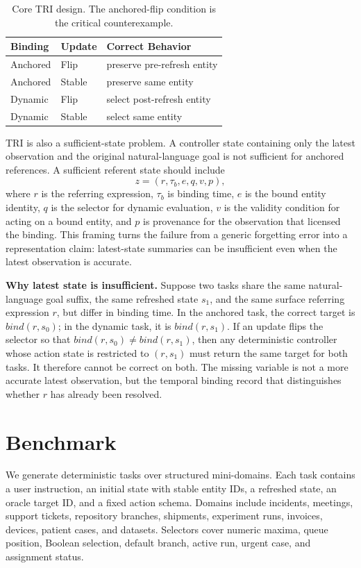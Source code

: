 \documentclass[letterpaper]{article}
\begin{document}
\begin{table}[t]
\centering
\small
\begin{tabular}{lll}
\toprule
Binding & Update & Correct Behavior \\
\midrule
Anchored & Flip & preserve pre-refresh entity \\
Anchored & Stable & preserve same entity \\
Dynamic & Flip & select post-refresh entity \\
Dynamic & Stable & select same entity \\
\bottomrule
\end{tabular}
\caption{Core TRI design. The anchored-flip condition is the critical counterexample.}
\label{tab:design}
\end{table}

TRI is also a sufficient-state problem. A controller state containing only the latest observation and the original natural-language goal is not sufficient for anchored references. A sufficient referent state should include
\[
z = (r, \tau_b, e, q, v, p),
\]
where $r$ is the referring expression, $\tau_b$ is binding time, $e$ is the bound entity identity, $q$ is the selector for dynamic evaluation, $v$ is the validity condition for acting on a bound entity, and $p$ is provenance for the observation that licensed the binding. This framing turns the failure from a generic forgetting error into a representation claim: latest-state summaries can be insufficient even when the latest observation is accurate.

\textbf{Why latest state is insufficient.} Suppose two tasks share the same natural-language goal suffix, the same refreshed state $s_1$, and the same surface referring expression $r$, but differ in binding time. In the anchored task, the correct target is $bind(r,s_0)$; in the dynamic task, it is $bind(r,s_1)$. If an update flips the selector so that $bind(r,s_0)\ne bind(r,s_1)$, then any deterministic controller whose action state is restricted to $(r,s_1)$ must return the same target for both tasks. It therefore cannot be correct on both. The missing variable is not a more accurate latest observation, but the temporal binding record that distinguishes whether $r$ has already been resolved.

\section{Benchmark}

We generate deterministic tasks over structured mini-domains. Each task contains a user instruction, an initial state with stable entity IDs, a refreshed state, an oracle target ID, and a fixed action schema. Domains include incidents, meetings, support tickets, repository branches, shipments, experiment runs, invoices, devices, patient cases, and datasets. Selectors cover numeric maxima, queue position, Boolean selection, default branch, active run, urgent case, and assignment status.
\end{document}
